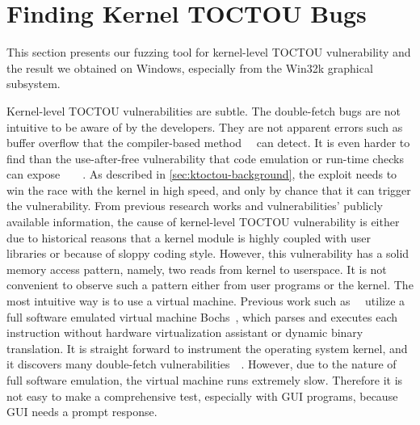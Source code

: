 \section{Finding Kernel TOCTOU Bugs}
\label{sec:ktoctou-experiment}



This section presents our fuzzing tool for kernel-level TOCTOU vulnerability and the result we obtained on Windows, especially from the Win32k graphical subsystem.

Kernel-level TOCTOU vulnerabilities are subtle. The double-fetch bugs are not intuitive to be aware of by the developers. They are not apparent errors such as buffer overflow that the compiler-based method~\cite{nagarakatte2015everything}~\cite{zhang2010intpatch} can detect. It is even harder to find than the use-after-free vulnerability that code emulation or run-time checks can expose~\cite{feist2016finding}~\cite{chen2020savior}~\cite{lee2015preventing}~\cite{serebryany2012addresssanitizer}. As described in \autoref{sec:ktoctou-background}, the exploit needs to win the race with the kernel in high speed, and only by chance that it can trigger the vulnerability. From previous research works and vulnerabilities' publicly available information, the cause of kernel-level TOCTOU vulnerability is either due to historical reasons that a kernel module is highly coupled with user libraries or because of sloppy coding style. However, this vulnerability has a solid memory access pattern, namely, two reads from kernel to userspace. It is not convenient to observe such a pattern either from user programs or the kernel. The most intuitive way is to use a virtual machine. Previous work such as~\cite{jurczyk2013identifying}~\cite{bochspwnreloaded} utilize a full software emulated virtual machine Bochs~\cite{lawton2003bochs}, which parses and executes each instruction without hardware virtualization assistant or dynamic binary translation.  It is straight forward to instrument the operating system kernel, and it discovers many double-fetch vulnerabilities~\cite{jurczyk2013identifying}~\cite{bochspwnreloaded}. However, due to the nature of full software emulation, the virtual machine runs extremely slow. Therefore it is not easy to make a comprehensive test, especially with GUI programs, because GUI needs a prompt response.

